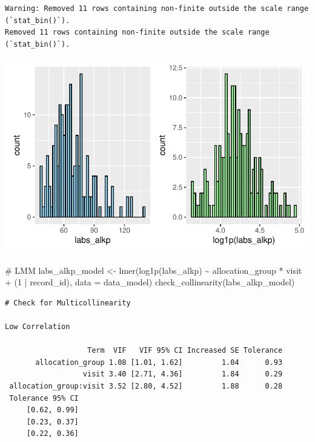 \documentclass[
  letterpaper,
  DIV=11,
  numbers=noendperiod]{scrartcl}
\newenvironment{Shaded}{\begin{snugshade}}{\end{snugshade}}
\newcommand{\AttributeTok}[1]{\textcolor[rgb]{0.40,0.45,0.13}{#1}}
\newcommand{\CommentTok}[1]{\textcolor[rgb]{0.37,0.37,0.37}{#1}}
\newcommand{\DecValTok}[1]{\textcolor[rgb]{0.68,0.00,0.00}{#1}}
\newcommand{\FunctionTok}[1]{\textcolor[rgb]{0.28,0.35,0.67}{#1}}
\newcommand{\NormalTok}[1]{\textcolor[rgb]{0.00,0.23,0.31}{#1}}
\newcommand{\OtherTok}[1]{\textcolor[rgb]{0.00,0.23,0.31}{#1}}
\newcommand{\SpecialCharTok}[1]{\textcolor[rgb]{0.37,0.37,0.37}{#1}}
\begin{document}
\begin{verbatim}
Warning: Removed 11 rows containing non-finite outside the scale range (`stat_bin()`).
Removed 11 rows containing non-finite outside the scale range (`stat_bin()`).
\end{verbatim}

\includegraphics{Outcomes_V1V2V3_files/figure-pdf/labs_alkp_1-1.pdf}

\begin{Shaded}
\begin{Highlighting}[]
\CommentTok{\# LMM}
\NormalTok{labs\_alkp\_model }\OtherTok{\textless{}{-}} \FunctionTok{lmer}\NormalTok{(}\FunctionTok{log1p}\NormalTok{(labs\_alkp) }\SpecialCharTok{\textasciitilde{}}\NormalTok{ allocation\_group }\SpecialCharTok{*}\NormalTok{ visit }\SpecialCharTok{+}\NormalTok{ (}\DecValTok{1} \SpecialCharTok{|}\NormalTok{ record\_id), }\AttributeTok{data =}\NormalTok{ data\_model)}
\FunctionTok{check\_collinearity}\NormalTok{(labs\_alkp\_model)}
\end{Highlighting}
\end{Shaded}

\begin{verbatim}
# Check for Multicollinearity

Low Correlation

                   Term  VIF   VIF 95% CI Increased SE Tolerance
       allocation_group 1.08 [1.01, 1.62]         1.04      0.93
                  visit 3.40 [2.71, 4.36]         1.84      0.29
 allocation_group:visit 3.52 [2.80, 4.52]         1.88      0.28
 Tolerance 95% CI
     [0.62, 0.99]
     [0.23, 0.37]
     [0.22, 0.36]
\end{verbatim}
\end{document}
